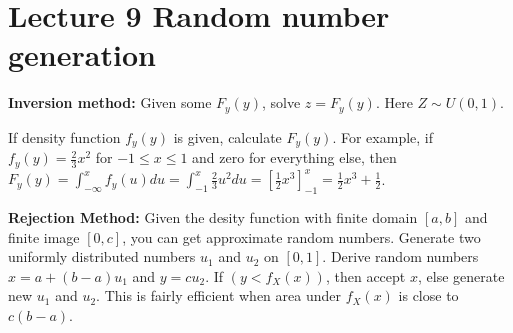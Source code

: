 \section{Lecture 9 Random number generation}

\textbf{Inversion method:} Given some $F_y(y)$, solve $z=F_y(y)$. Here $Z \sim U(0,1)$.

If density function $f_y(y)$ is given, calculate $F_y(y)$. For example, if $f_y(y) = \frac{2}{3}x^2$ for $-1 \leq x \leq 1$ and zero for everything else, then $F_y(y) = \int^x_{-\infty} f_y(u) du = \int^x_{-1}\frac{2}{3}u^2 du = [\frac{1}{2}x^3]^x_{-1} = \frac{1}{2}x^
3 + \frac{1}{2}$.

\textbf{Rejection Method:} Given the desity function with finite domain $[a,b]$ and finite image $[0, c]$, you can get approximate random numbers. Generate two uniformly distributed numbers $u_1$ and $u_2$ on $[0,1]$. Derive random numbers $x = a + (b-a)u_1$ and $y = cu_2$. If $(y < f_X(x))$, then accept $x$, else generate new $u_1$ and $u_2$. This is fairly efficient when area under $f_X(x)$ is close to $c(b-a)$.